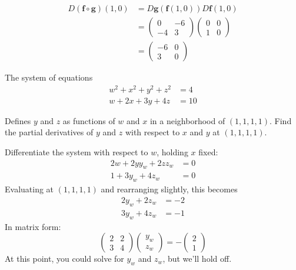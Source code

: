 \documentclass{exam}
\newcommand{\vf}{\mathbf{f}}
\newcommand{\vg}{\mathbf{g}}
\begin{document}
\begin{questions}
\begin{solution}
        \begin{align*}
            D(\vf\circ\vg)(1,0) &= D\vg(\vf(1,0))D\vf(1,0)\\
            &=\begin{pmatrix}
                0&-6\\-4&3
            \end{pmatrix}\begin{pmatrix}
                0&0\\1&0
            \end{pmatrix}\\
            &= \begin{pmatrix}
                -6&0\\3&0
            \end{pmatrix}
        \end{align*}
    \end{solution}

    \question
    The system of equations
    \begin{align*}
        w^2 + x^2 + y^2 + z^2 &= 4\\
        w + 2x + 3y + 4z &= 10
    \end{align*}

    Defines $y$ and $z$ as functions of $w$ and $x$ in a neighborhood of $(1,1,1,1)$.
    Find the partial derivatives of $y$ and $z$ with respect to $x$ and $y$ at $(1,1,1,1)$.

    \begin{solution}
        Differentiate the system with respect to $w$, holding $x$ fixed:
        \begin{align*}
            2w + 2yy_w + 2zz_w &= 0\\
            1 + 3y_w + 4z_w &= 0
        \end{align*}
        Evaluating at $(1,1,1,1)$ and rearranging slightly, this becomes
        \begin{align*}
            2y_w + 2z_w &= -2\\
            3y_w + 4z_w &= -1
        \end{align*}
        In matrix form:
        \[
            \begin{pmatrix}
                2&2\\3&4
            \end{pmatrix}\begin{pmatrix}
                y_w\\z_w
            \end{pmatrix}= -\begin{pmatrix}
                2\\1
            \end{pmatrix}\tag{\dag}
        \]
        At this point, you could solve for $y_w$ and $z_w$, but we'll hold off.


\end{solution}
\end{questions}
\end{document}
